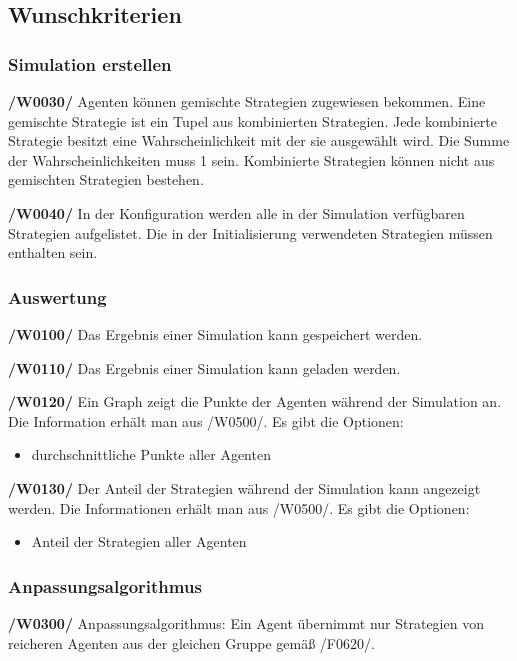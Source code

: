 \subsection{Wunschkriterien}

\subsubsection{Simulation erstellen}

\textbf{/W0030/}
Agenten können gemischte Strategien zugewiesen bekommen. Eine gemischte Strategie ist ein Tupel aus kombinierten Strategien. Jede kombinierte Strategie besitzt eine Wahrscheinlichkeit mit der sie ausgewählt wird. Die Summe der Wahrscheinlichkeiten muss 1 sein. Kombinierte Strategien können nicht aus gemischten Strategien bestehen.

\textbf{/W0040/}
In der Konfiguration werden alle in der Simulation verfügbaren Strategien aufgelistet. Die in der Initialisierung verwendeten Strategien müssen enthalten sein.

\subsubsection{Auswertung}

\textbf{/W0100/}
Das Ergebnis einer Simulation kann gespeichert werden.

\textbf{/W0110/}
Das Ergebnis einer Simulation kann geladen werden.

\textbf{/W0120/}
Ein Graph zeigt die Punkte der Agenten während der Simulation an. Die Information erhält man aus /W0500/. Es gibt die Optionen:
\begin{itemize}
\item durchschnittliche Punkte aller Agenten
\end{itemize}

\textbf{/W0130/}
Der Anteil der Strategien während der Simulation kann angezeigt werden. Die Informationen erhält man aus /W0500/. Es gibt die Optionen:
\begin{itemize}
\item Anteil der Strategien aller Agenten
\end{itemize}

\subsubsection{Anpassungsalgorithmus}

\textbf{/W0300/}
Anpassungsalgorithmus: Ein Agent übernimmt nur Strategien von reicheren Agenten aus der gleichen Gruppe gemäß /F0620/.

